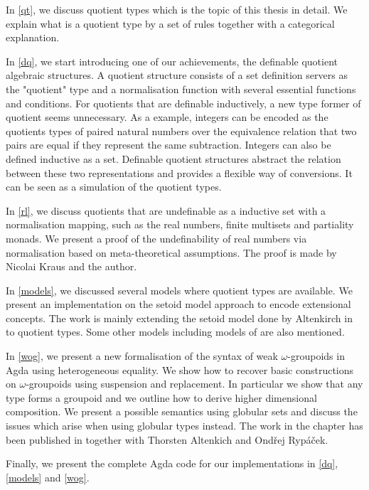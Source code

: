 In \autoref{qt}, we discuss quotient types which is the topic of
this thesis in detail. We explain what is a quotient type by a set of rules  together with a categorical explanation.


In \autoref{dq}, we start introducing one of our achievements, the
definable quotient algebraic structures. A quotient structure consists of a set definition servers as the "quotient" type and a normalisation function with several essential functions and conditions.
For quotients that are definable inductively, a new type former of quotient seems unnecessary.
As a example, integers can be encoded as the
quotients types of paired natural numbers over the equivalence
relation that two pairs are equal if they represent the same
subtraction. Integers can also be defined inductive as a set. Definable quotient structures abstract the relation between these two representations and provides a flexible way of conversions. It can be seen as 
a simulation of the quotient types.


In \autoref{rl}, we discuss quotients that are undefinable as a inductive set with a normalisation mapping, such as the real numbers, finite multisets and partiality monads. We present a proof of the undefinability of real numbers via normalisation based on meta-theoretical assumptions. The proof is made by Nicolai Kraus and the author.

In \autoref{models}, we discussed several models where quotient types are available. We present an implementation on the setoid model approach to encode
extensional concepts. The work is mainly extending the setoid model
done by Altenkirch in \cite{alti:lics99} to
quotient types. Some other models including models of \hott are also mentioned.


In \autoref{wog}, we present a new formalisation of the syntax of weak
  $\omega$-groupoids in Agda using heterogeneous equality. We show how
  to recover basic constructions on $\omega$-groupoids using
  suspension and replacement. In particular we show that any type
  forms a groupoid and we outline how to derive higher dimensional
  composition. We present a possible semantics using globular sets and
  discuss the issues which arise when using globular types instead. The work in the chapter has been published in \cite{LFMTP14} together with Thorsten Altenkich and Ond\v{r}ej Ryp\'{a}\v{c}ek.


Finally, we present the complete Agda code for our implementations in \autoref{dq}, \autoref{models} and \autoref{wog}.
